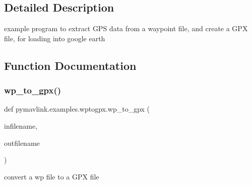 \subsection{Detailed Description}
\begin{DoxyVerb}example program to extract GPS data from a waypoint file, and create a GPX
file, for loading into google earth
\end{DoxyVerb}
 

\subsection{Function Documentation}
\mbox{\label{namespacepymavlink_1_1examples_1_1wptogpx_a1e2a92ba9dc9c4b0facc6734a2b8baa3}} 
\subsubsection{\texorpdfstring{wp\+\_\+to\+\_\+gpx()}{wp\_to\_gpx()}}
{\footnotesize\ttfamily def pymavlink.\+examples.\+wptogpx.\+wp\+\_\+to\+\_\+gpx (\begin{DoxyParamCaption}\item[{}]{infilename,  }\item[{}]{outfilename }\end{DoxyParamCaption})}

\begin{DoxyVerb}convert a wp file to a GPX file\end{DoxyVerb}
 